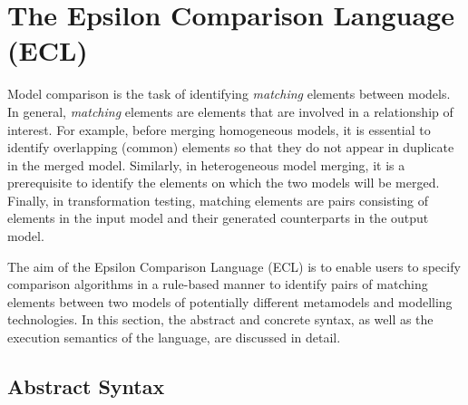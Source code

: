 \chapter{The Epsilon Comparison Language (ECL)}
\label{sec:ECL}

Model comparison is the task of identifying \emph{matching} elements between models. In general, \emph{matching} elements are elements that are involved in a relationship of interest. For example, before merging homogeneous models, it is essential to identify overlapping (common) elements so that they do not appear in duplicate in the merged model. Similarly, in heterogeneous model merging, it is a prerequisite to identify the elements on which the two models will be merged. Finally, in transformation testing, matching elements are pairs consisting of elements in the input model and their generated counterparts in the output model.

The aim of the Epsilon Comparison Language (ECL) is to enable users to specify comparison algorithms in a rule-based manner to identify pairs of matching elements between two models of potentially different metamodels and modelling technologies. In this section, the abstract and concrete syntax, as well as the execution semantics of the language, are discussed in detail.

%

\section{Abstract Syntax}

